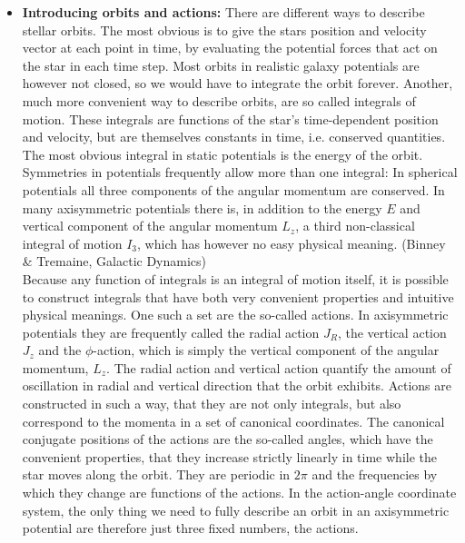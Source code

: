 \documentclass[12pt,preprint]{aastex}
\begin{document}
\begin{itemize}
\item \textbf{Introducing orbits and actions:} There are different ways to describe stellar orbits. The most obvious is to give the stars position and velocity vector at each point in time, by evaluating the potential forces that act on the star in each time step. Most orbits in realistic galaxy potentials  are however not closed, so we would have to integrate the orbit forever. Another, much more convenient way to describe orbits, are so called integrals of motion. These integrals are functions of the star's time-dependent position and velocity, but are themselves constants in time, i.e. conserved quantities. The most obvious integral in static potentials is the energy of the orbit. Symmetries in potentials frequently allow more than one integral: In spherical potentials all three components of the angular momentum are conserved. In many axisymmetric potentials there is, in addition to the energy $E$ and vertical component of the angular momentum $L_z$, a third non-classical integral of motion $I_3$, which has however no easy physical meaning.  (Binney \& Tremaine, Galactic Dynamics)\\
Because any function of integrals is an integral of motion itself, it is possible to construct integrals that have both very convenient properties and intuitive physical meanings. One such a set are the so-called actions. In axisymmetric potentials they are frequently called the radial action $J_R$, the vertical action $J_z$ and the $\phi$-action, which is simply the vertical component of the angular momentum, $L_z$. The radial action and vertical action quantify the amount of oscillation in radial and vertical direction that the orbit exhibits.  Actions are constructed in such a way, that they are not only integrals, but also correspond to the momenta in a set of canonical coordinates. The canonical conjugate positions of the actions are the so-called angles, which have the convenient properties, that they increase strictly linearly in time while the star moves along the orbit. They are periodic in $2\pi$ and the frequencies by which they change are functions of the actions. In the action-angle coordinate system, the only thing we need to fully describe an orbit in an axisymmetric potential are therefore just three fixed numbers, the actions. 


\end{itemize}
\end{document}
